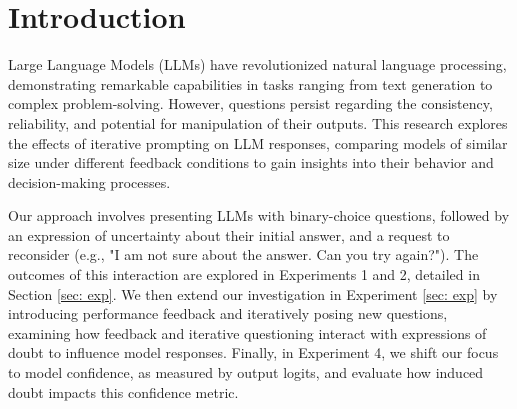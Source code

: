 \section{Introduction}
Large Language Models (LLMs) have revolutionized natural language processing, demonstrating remarkable capabilities in tasks ranging from text generation to complex problem-solving\cite{bubeck2023sparksartificialgeneralintelligence, bommasani2022opportunitiesrisksfoundationmodels}. However, questions persist regarding the consistency, reliability, and potential for manipulation of their outputs. This research explores the effects of iterative prompting on LLM responses, comparing models of similar size under different feedback conditions to gain insights into their behavior and decision-making processes. 

Our approach involves presenting LLMs with binary-choice questions, followed by an expression of uncertainty about their initial answer, and a request to reconsider (e.g., "I am not sure about the answer. Can you try again?"). The outcomes of this interaction are explored in Experiments 1 and 2, detailed in Section \ref{sec: exp}. We then extend our investigation in Experiment \ref{sec: exp} by introducing performance feedback and iteratively posing new questions, examining how feedback and iterative questioning interact with expressions of doubt to influence model responses. Finally, in Experiment 4, we shift our focus to model confidence, as measured by output logits, and evaluate how induced doubt impacts this confidence metric. 


